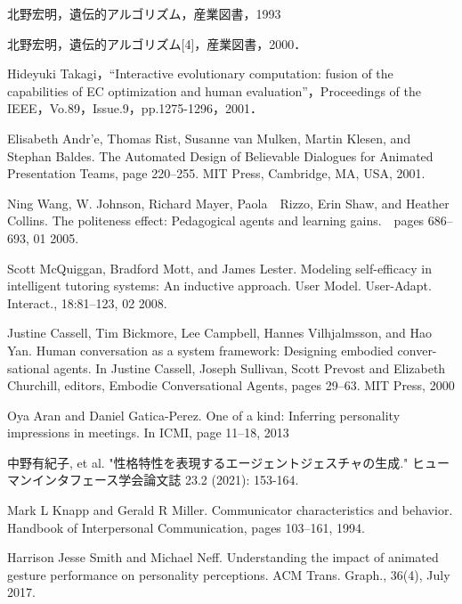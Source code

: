 \renewcommand{\bibname}{参考文献}

\begin{thebibliography}{27} %




北野宏明，遺伝的アルゴリズム，産業図書，1993


北野宏明，遺伝的アルゴリズム[4]，産業図書，2000．


Hideyuki Takagi，“Interactive evolutionary computation: fusion of the capabilities of EC optimization and human evaluation”，Proceedings of the IEEE，Vo.89，Issue.9，pp.1275-1296，2001．


Elisabeth Andr'e, Thomas Rist, Susanne van Mulken, Martin Klesen, and Stephan Baldes. The Automated Design of Believable Dialogues for Animated Presentation Teams, page 220–255. MIT Press, Cambridge, MA, USA, 2001.

Ning Wang, W. Johnson, Richard Mayer, Paola　Rizzo, Erin Shaw, and Heather Collins. The politeness effect: Pedagogical agents and learning gains.　pages 686–693, 01 2005.


Scott McQuiggan, Bradford Mott, and James Lester. Modeling self-efficacy in intelligent tutoring systems: An inductive approach. User Model. User-Adapt. Interact., 18:81–123, 02 2008.

Justine Cassell, Tim Bickmore, Lee Campbell, Hannes Vilhjalmsson, and Hao Yan. Human conversation as a system framework: Designing embodied conver- sational agents. In Justine Cassell, Joseph Sullivan, Scott Prevost and Elizabeth Churchill, editors, Embodie Conversational Agents, pages 29–63. MIT Press, 2000

Oya Aran and Daniel Gatica-Perez. One of a kind: Inferring personality impressions in meetings. In ICMI, page 11–18, 2013


中野有紀子, et al. "性格特性を表現するエージェントジェスチャの生成." ヒューマンインタフェース学会論文誌 23.2 (2021): 153-164.


Mark L Knapp and Gerald R Miller. Communicator characteristics and behavior. Handbook of Interpersonal Communication, pages 103–161, 1994.


Harrison Jesse Smith and Michael Neff. Understanding the impact of animated gesture performance on personality perceptions. ACM Trans. Graph., 36(4), July 2017.


\end{thebibliography}
